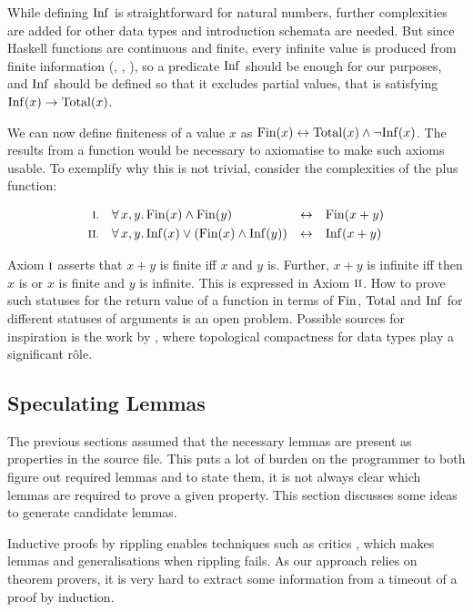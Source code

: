While defining $\mathrm{Inf}$ is straightforward for natural numbers, further
complexities are added for other data types and introduction schemata
are needed. But since Haskell functions are continuous and finite,
every infinite value is produced from finite information (,
, ), so a predicate $\mathrm{Inf}$ should be enough
for our purposes, and $\mathrm{Inf}$ should be defined so that it excludes
partial values, that is satisfying $\mathrm{Inf}(x) \rightarrow \mathrm{Total}(x)$.

\pagebreak

We can now define finiteness of a value $x$ as
$\mathrm{Fin}(x) \leftrightarrow \mathrm{Total}(x) \wedge \neg \mathrm{Inf}(x)$.  The results
from a function would be necessary to axiomatise to make such axioms
usable. To exemplify why this is not trivial, consider the
complexities of the plus function:

\begin{align*}
\rom{1} && \faa{x}{y} & \Fin(x) \wedge \Fin(y)                  & \leftrightarrow &&& \Fin(x + y) \\
\rom{2} && \faa{x}{y} & \Inf(x) \vee (\Fin(x) \wedge \Inf(y)) & \leftrightarrow &&& \Inf(x + y)
\end{align*}

\noindent
Axiom $\romnodot{1}$ asserts that $x + y$ is finite iff $x$ and $y$
is. Further, $x + y$ is infinite iff then $x$ is or $x$ is finite and
$y$ is infinite. This is expressed in Axiom $\romnodot{2}$. How to
prove such statuses for the return value of a function in terms of
$\mathrm{Fin}$, $\mathrm{Total}$ and $\mathrm{Inf}$ for different statuses of arguments is an
open problem. Possible sources for inspiration is the work by
\cite{exhaustiblesets}, where topological compactness for data types
play a significant r\^{o}le.

\subsection{Speculating Lemmas}

The previous sections assumed that the necessary lemmas are present as
properties in the source file. This puts a lot of burden on the
programmer to both figure out required lemmas and to state them, it is
not always clear which lemmas are required to prove a given
property. This section discusses some ideas to generate candidate
lemmas.

Inductive proofs by rippling enables techniques such as critics
\citep{productiveuse}, which makes lemmas and generalisations when
rippling fails. As our approach relies on theorem provers, it is very
hard to extract some information from a timeout of a proof by induction.

